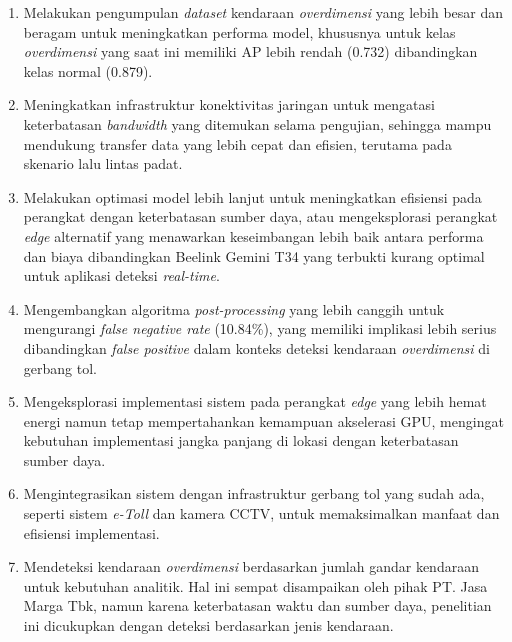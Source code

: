 \begin{enumerate}[nolistsep]

  \item Melakukan pengumpulan \emph{dataset} kendaraan \emph{overdimensi} yang lebih besar dan beragam untuk meningkatkan performa model, khususnya untuk kelas \emph{overdimensi} yang saat ini memiliki AP lebih rendah (0.732) dibandingkan kelas normal (0.879).

  \item Meningkatkan infrastruktur konektivitas jaringan untuk mengatasi keterbatasan \emph{bandwidth} yang ditemukan selama pengujian, sehingga mampu mendukung transfer data yang lebih cepat dan efisien, terutama pada skenario lalu lintas padat.

  \item Melakukan optimasi model lebih lanjut untuk meningkatkan efisiensi pada perangkat dengan keterbatasan sumber daya, atau mengeksplorasi perangkat \emph{edge} alternatif yang menawarkan keseimbangan lebih baik antara performa dan biaya dibandingkan Beelink Gemini T34 yang terbukti kurang optimal untuk aplikasi deteksi \emph{real-time}.
  
  \item Mengembangkan algoritma \emph{post-processing} yang lebih canggih untuk mengurangi \emph{false negative rate} (10.84\%), yang memiliki implikasi lebih serius dibandingkan \emph{false positive} dalam konteks deteksi kendaraan \emph{overdimensi} di gerbang tol.

  \item Mengeksplorasi implementasi sistem pada perangkat \emph{edge} yang lebih hemat energi namun tetap mempertahankan kemampuan akselerasi GPU, mengingat kebutuhan implementasi jangka panjang di lokasi dengan keterbatasan sumber daya.
  
  \item Mengintegrasikan sistem dengan infrastruktur gerbang tol yang sudah ada, seperti sistem \emph{e-Toll} dan kamera CCTV, untuk memaksimalkan manfaat dan efisiensi implementasi.
  
  \item Mendeteksi kendaraan \emph{overdimensi} berdasarkan jumlah gandar kendaraan untuk kebutuhan analitik. Hal ini sempat disampaikan oleh pihak PT. Jasa Marga Tbk, namun karena keterbatasan waktu dan sumber daya, penelitian ini dicukupkan dengan deteksi berdasarkan jenis kendaraan.

\end{enumerate}
